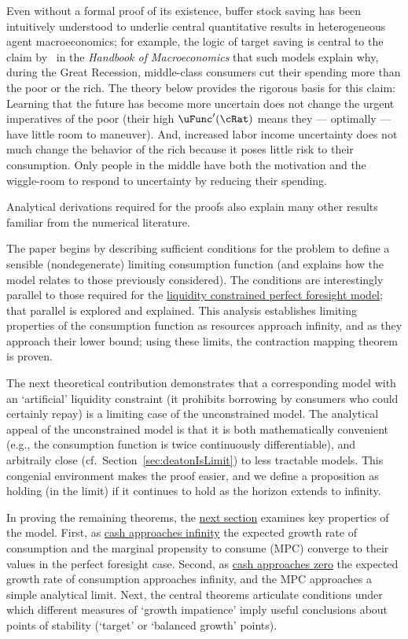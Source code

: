 \documentclass[BufferStockTheory]{subfiles}
\begin{document}
\hypertarget{KMP}{} Even without a formal proof of its existence, buffer stock saving has been intuitively understood to underlie central quantitative results in heterogeneous agent macroeconomics; for example, the logic of target saving is central to the claim by~\cite{kmpHandbook} in the \textit{Handbook of Macroeconomics} that such models explain why, during the Great Recession, middle-class consumers cut their spending more than the poor or the rich.  The theory below provides the rigorous basis for this claim:  Learning that the future has become more uncertain does not change the urgent imperatives of the poor (their high $\uFunc^{\prime}(\cRat)$ means they --- optimally --- have little room to maneuver).  And, increased labor income uncertainty does not much change the behavior of the rich because it poses little risk to their consumption.  Only people in the middle have both the motivation and the wiggle-room to respond to uncertainty by reducing their spending.

Analytical derivations required for the proofs also explain many other results familiar from the numerical literature.

The paper begins by describing sufficient conditions for the problem to define a sensible (nondegenerate) limiting consumption function (and explains how the model relates to those previously considered).  The conditions are interestingly parallel to those required for the \hyperlink{Factors-Defined-And-Compared}{liquidity constrained perfect foresight model}; that parallel is explored and explained.  This analysis establishes limiting properties of the consumption function as resources approach infinity, and as they approach their lower bound; using these limits, the contraction mapping theorem is proven.

The next theoretical contribution demonstrates that a corresponding model with an `artificial' liquidity constraint (it prohibits borrowing by consumers who could certainly repay) is a limiting case of the unconstrained model.  The analytical appeal of the unconstrained model is that it is both mathematically convenient (e.g., the consumption function is twice continuously differentiable), and arbitraily close (cf.\ Section~\ref{sec:deatonIsLimit}) to less tractable models. This congenial environment makes the proof easier, and we define a proposition as holding (in the limit) if it continues to hold as the horizon extends to infinity.

In proving the remaining theorems, the \hyperlink{AnalysisoftheConvergedConsumptionFunction}{next section} examines key properties of the model. First, as \hyperlink{LimitsAsmtToInfty}{cash approaches infinity} the expected growth rate of consumption and the marginal propensity to consume (MPC) converge to their values in the perfect foresight case. Second, as \hyperlink{LimitsAsmtToZero}{cash approaches zero} the expected growth rate of consumption approaches infinity, and the MPC approaches a simple analytical limit.  Next, the central theorems articulate conditions under which different measures of `growth impatience' imply useful conclusions about points of stability (`target' or `balanced growth' points).
\end{document}
